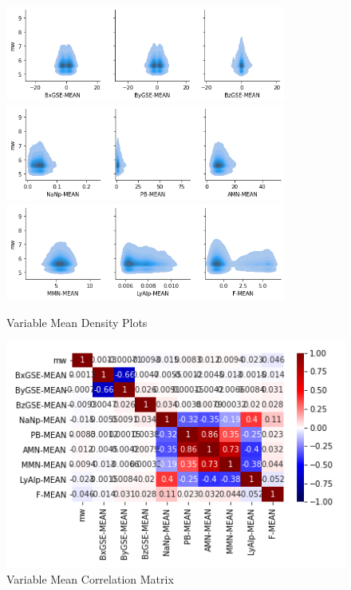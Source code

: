 \documentclass[12pt]{article}
\begin{document}
\begin{figure}
\centering
   \includegraphics[width=0.82\textwidth]{mean_kdeplot_1.png}
   \includegraphics[width=0.82\textwidth]{mean_kdeplot_2.png}
   \includegraphics[width=0.82\textwidth]{mean_kdeplot_3.png}
   \caption{Variable Mean Density Plots}

   \includegraphics{mean_heatmap.png}
   \caption{Variable Mean Correlation Matrix}
\end{figure}

\newpage
\end{document}
